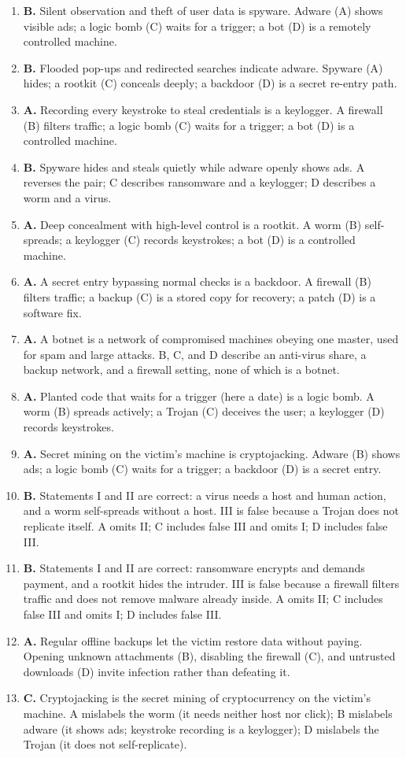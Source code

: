 \begin{enumerate}[label=\textbf{Q\arabic*.}, leftmargin=*]
\item \textbf{B.} Silent observation and theft of user data is spyware.
  Adware (A) shows visible ads; a logic bomb (C) waits for a trigger; a bot
  (D) is a remotely controlled machine.
\item \textbf{B.} Flooded pop-ups and redirected searches indicate adware.
  Spyware (A) hides; a rootkit (C) conceals deeply; a backdoor (D) is a
  secret re-entry path.
\item \textbf{A.} Recording every keystroke to steal credentials is a
  keylogger. A firewall (B) filters traffic; a logic bomb (C) waits for a
  trigger; a bot (D) is a controlled machine.
\item \textbf{B.} Spyware hides and steals quietly while adware openly shows
  ads. A reverses the pair; C describes ransomware and a keylogger; D
  describes a worm and a virus.
\item \textbf{A.} Deep concealment with high-level control is a rootkit. A
  worm (B) self-spreads; a keylogger (C) records keystrokes; a bot (D) is a
  controlled machine.
\item \textbf{A.} A secret entry bypassing normal checks is a backdoor. A
  firewall (B) filters traffic; a backup (C) is a stored copy for recovery;
  a patch (D) is a software fix.
\item \textbf{A.} A botnet is a network of compromised machines obeying one
  master, used for spam and large attacks. B, C, and D describe an
  anti-virus share, a backup network, and a firewall setting, none of which
  is a botnet.
\item \textbf{A.} Planted code that waits for a trigger (here a date) is a
  logic bomb. A worm (B) spreads actively; a Trojan (C) deceives the user;
  a keylogger (D) records keystrokes.
\item \textbf{A.} Secret mining on the victim's machine is cryptojacking.
  Adware (B) shows ads; a logic bomb (C) waits for a trigger; a backdoor
  (D) is a secret entry.
\item \textbf{B.} Statements I and II are correct: a virus needs a host and
  human action, and a worm self-spreads without a host. III is false because
  a Trojan does not replicate itself. A omits II; C includes false III and
  omits I; D includes false III.
\item \textbf{B.} Statements I and II are correct: ransomware encrypts and
  demands payment, and a rootkit hides the intruder. III is false because a
  firewall filters traffic and does not remove malware already inside. A
  omits II; C includes false III and omits I; D includes false III.
\item \textbf{A.} Regular offline backups let the victim restore data
  without paying. Opening unknown attachments (B), disabling the firewall
  (C), and untrusted downloads (D) invite infection rather than defeating
  it.
\item \textbf{C.} Cryptojacking is the secret mining of cryptocurrency on the
  victim's machine. A mislabels the worm (it needs neither host nor click);
  B mislabels adware (it shows ads; keystroke recording is a keylogger); D
  mislabels the Trojan (it does not self-replicate).


\end{enumerate}
